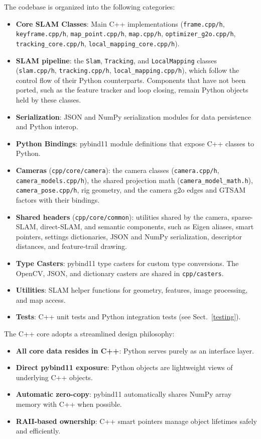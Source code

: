 \documentclass{article}
\begin{document}
The codebase is organized into the following categories:
\begin{itemize}
\item \textbf{Core SLAM Classes}: Main C++ implementations (\texttt{frame.cpp/h}, \texttt{keyframe.cpp/h}, \texttt{map\_point.cpp/h}, \texttt{map.cpp/h}, \texttt{optimizer\_g2o.cpp/h}, \texttt{tracking\_core.cpp/h}, \texttt{local\_mapping\_core.cpp/h}).
\item \textbf{SLAM pipeline}: the \texttt{Slam}, \texttt{Tracking}, and \texttt{LocalMapping} classes (\texttt{slam.cpp/h}, \texttt{tracking.cpp/h}, \texttt{local\_mapping.cpp/h}), which follow the control flow of their Python counterparts. Components that have not been ported, such as the feature tracker and loop closing, remain Python objects held by these classes.
\item \textbf{Serialization}: JSON and NumPy serialization modules for data persistence and Python interop.
\item \textbf{Python Bindings}: pybind11 module definitions that expose C++ classes to Python.
\item \textbf{Cameras} (\texttt{cpp/core/camera}): the camera classes (\texttt{camera.cpp/h}, \texttt{camera\_models.cpp/h}), the shared projection math (\texttt{camera\_model\_math.h}), \texttt{camera\_pose.cpp/h}, rig geometry, and the camera g2o edges and GTSAM factors with their bindings.
\item \textbf{Shared headers} (\texttt{cpp/core/common}): utilities shared by the camera, sparse-SLAM, direct-SLAM, and semantic components, such as Eigen aliases, smart pointers, settings dictionaries, JSON and NumPy serialization, descriptor distances, and feature-trail drawing.
\item \textbf{Type Casters}: pybind11 type casters for custom type conversions. The OpenCV, JSON, and dictionary casters are shared in \texttt{cpp/casters}.
\item \textbf{Utilities}: SLAM helper functions for geometry, features, image processing, and map access.
\item \textbf{Tests}: C++ unit tests and Python integration tests (see Sect.~\ref{testing}).
\end{itemize}

The C++ core adopts a streamlined design philosophy:
\begin{itemize}
\item \textbf{All core data resides in C++}: Python serves purely as an interface layer.
\item \textbf{Direct pybind11 exposure}: Python objects are lightweight views of underlying C++ objects.
\item \textbf{Automatic zero-copy}: pybind11 automatically shares NumPy array memory with C++ when possible.
\item \textbf{RAII-based ownership}: C++ smart pointers manage object lifetimes safely and efficiently.
\end{itemize}
\end{document}
